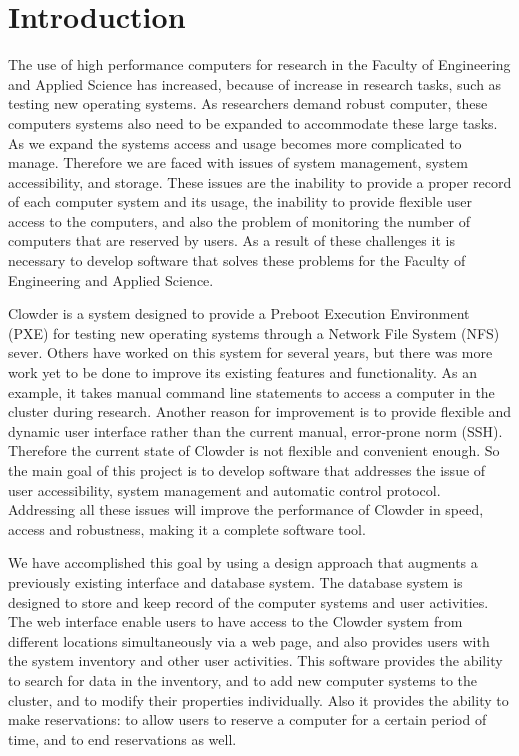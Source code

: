 \chapter{Introduction}
\label{chap:intro}

The use of high performance computers for  research in the Faculty of Engineering  and Applied Science has increased, because of increase in research tasks, such as testing new operating systems. As researchers demand robust computer, these computers systems also need to be expanded to accommodate these large tasks. As we expand the systems access and usage  becomes more complicated to manage. Therefore we are faced with issues of system management, system accessibility, and storage. These issues are the inability to provide  a proper record of each computer system and its usage, the inability to provide flexible user access to the computers, and also the problem of monitoring the number of computers that are reserved by users. As a result of these challenges it is necessary to develop software that solves these problems for the Faculty of Engineering and Applied Science. 


Clowder is a system designed to provide a Preboot Execution Environment (PXE) for testing new operating systems through a Network File System (NFS) sever. Others have worked on this system for several years, but there was more work yet to be done to improve its existing features and functionality. As an example, it takes manual command line statements to access  a computer in the cluster during research. Another reason for improvement is to provide flexible and dynamic user interface rather than the current manual, error-prone norm (SSH). Therefore the current state of Clowder is not flexible and convenient enough. So the main goal of this project is to develop software that addresses the issue of user accessibility, system management and automatic control protocol. Addressing all these issues will improve the performance of Clowder in speed, access and robustness, making it a complete software tool. 
	
	
We have accomplished this goal by using a design approach that augments a previously existing interface and database system. The database system is designed to store and keep record of the computer systems and user activities. The web interface enable users to have access to the Clowder system from different locations simultaneously via a web page, and also provides users with the system inventory and other user activities. This  software provides the ability to search for data in the inventory, and to add new computer systems to the cluster, and to modify their properties individually. Also it provides the ability to make reservations: to allow users to reserve a computer for a certain period of time, and to end reservations as well.    
	

